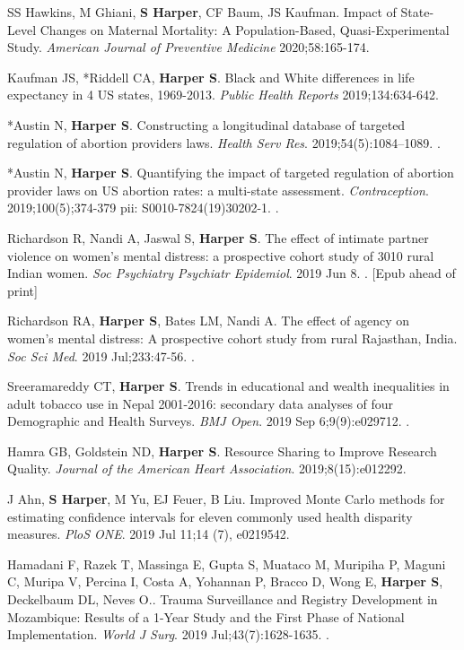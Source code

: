 \documentclass[
  letterpaper,
  DIV=11,
  numbers=noendperiod]{scrartcl}
\begin{document}
SS Hawkins, M Ghiani, \textbf{S Harper}, CF Baum, JS Kaufman. Impact of
State-Level Changes on Maternal Mortality: A Population-Based,
Quasi-Experimental Study. \emph{American Journal of Preventive Medicine}
2020;58:165-174.

Kaufman JS, *Riddell CA, \textbf{Harper S}. Black and White differences
in life expectancy in 4 US states, 1969-2013. \emph{Public Health
Reports} 2019;134:634-642.

*Austin N, \textbf{Harper S}. Constructing a longitudinal database of
targeted regulation of abortion providers laws. \emph{Health Serv Res}.
2019;54(5):1084--1089. .

*Austin N, \textbf{Harper S}. Quantifying the impact of targeted
regulation of abortion provider laws on US abortion rates: a multi-state
assessment. \emph{Contraception}. 2019;100(5);374-379 pii:
S0010-7824(19)30202-1. .

Richardson R, Nandi A, Jaswal S, \textbf{Harper S}. The effect of
intimate partner violence on women's mental distress: a prospective
cohort study of 3010 rural Indian women. \emph{Soc Psychiatry Psychiatr
Epidemiol}. 2019 Jun 8. . {[}Epub ahead of print{]}

Richardson RA, \textbf{Harper S}, Bates LM, Nandi A. The effect of
agency on women's mental distress: A prospective cohort study from rural
Rajasthan, India. \emph{Soc Sci Med}. 2019 Jul;233:47-56. .

Sreeramareddy CT, \textbf{Harper S}. Trends in educational and wealth
inequalities in adult tobacco use in Nepal 2001-2016: secondary data
analyses of four Demographic and Health Surveys. \emph{BMJ Open}. 2019
Sep 6;9(9):e029712. .

Hamra GB, Goldstein ND, \textbf{Harper S}. Resource Sharing to Improve
Research Quality. \emph{Journal of the American Heart Association}.
2019;8(15):e012292.

J Ahn, \textbf{S Harper}, M Yu, EJ Feuer, B Liu. Improved Monte Carlo
methods for estimating confidence intervals for eleven commonly used
health disparity measures. \emph{PloS ONE}. 2019 Jul 11;14 (7),
e0219542.

Hamadani F, Razek T, Massinga E, Gupta S, Muataco M, Muripiha P, Maguni
C, Muripa V, Percina I, Costa A, Yohannan P, Bracco D, Wong E,
\textbf{Harper S}, Deckelbaum DL, Neves O.. Trauma Surveillance and
Registry Development in Mozambique: Results of a 1-Year Study and the
First Phase of National Implementation. \emph{World J Surg}. 2019
Jul;43(7):1628-1635. .
\end{document}
